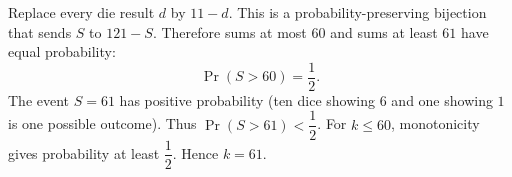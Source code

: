 Replace every die result $d$ by $11-d$. This is a probability-preserving bijection that sends $S$ to $121-S$. Therefore sums at most $60$ and sums at least $61$ have equal probability:
\[
\Pr(S>60)=\dfrac{1}{2}.
\]
The event $S=61$ has positive probability (ten dice showing $6$ and one showing $1$ is one possible outcome). Thus $\Pr(S>61)<\dfrac{1}{2}$. For $k\le60$, monotonicity gives probability at least $\dfrac{1}{2}$. Hence $\boxed{k=61}$.
